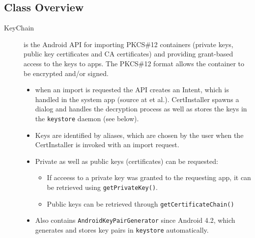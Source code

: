\documentclass[a4paper,draft]{scrartcl}
\begin{document}
	\subsection{Class Overview}
		\begin{description}
			\item[KeyChain] is the Android API for importing PKCS\#12 containers (private keys, public key certificates and CA certificates) and providing grant-based access to the keys to apps. The PKCS\#12 format allows the container to be encrypted and/or signed.
				\begin{itemize}
					\item when an import is requested the API creates an Intent, which is handled in the system app  (source at  et al.). CertInstaller spawns a dialog and handles the decryption process as well as stores the keys in the \texttt{keystore} daemon (see below).
					\item Keys are identified by aliases, which are chosen by the user when the CertInstaller is invoked with an import request.
					\item Private as well as public keys (certificates) can be requested:
					\begin{itemize}
						\item If acceess to a private key was granted to the requesting app, it can be retrieved using \texttt{getPrivateKey()}.
						\item Public keys can be retrieved through \texttt{getCertificateChain()}
					\end{itemize}
				\item Also contains \texttt{AndroidKeyPairGenerator} since Android 4.2, which generates and stores key pairs in \texttt{key\-store} automatically.
				\end{itemize}


\end{description}
\end{document}
